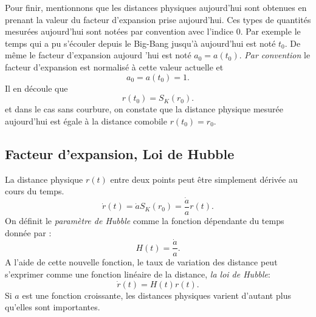 Pour finir, mentionnons que les distances physiques aujourd'hui sont obtenues en prenant la valeur du facteur d'expansion prise aujourd'hui. Ces types de quantités mesurées aujourd'hui sont notées par convention avec l'indice 0. Par exemple le temps qui a pu s'écouler depuis le Big-Bang jusqu'à aujourd'hui est noté $t_0$. De même le facteur d'expansion aujourd 'hui est noté $a_0=a(t_0)$.
\textit{Par convention} le facteur d'expansion est normalisé à cette valeur actuelle et 
\begin{equation}
a_0=a(t_0)=1.
\end{equation}
Il en découle que 
\begin{equation}
r(t_0)=S_K(r_0).
\end{equation}
et dans le cas sans courbure, on constate que la distance physique mesurée aujourd'hui est égale à la distance comobile $r(t_0)=r_0$.

\subsection{Facteur d'expansion, Loi de Hubble}
La distance physique $r(t)$ entre deux points peut être simplement dérivée au cours du temps.
\begin{equation}
\dot r(t)= \dot a S_K(r_0) =\frac{\dot a}{a}r(t).
\end{equation}
On définit le \textit{paramètre de Hubble} comme la fonction dépendante du temps donnée par :
\begin{equation}
H(t)=\frac{\dot a}{a}.
\label{e:hubble}
\end{equation}
A l'aide de cette nouvelle fonction, le taux de variation des distance peut s'exprimer comme une fonction linéaire de la distance, \textit{la loi de Hubble}:
\begin{equation}
\dot r(t) = H(t) r(t).
\label{e:hubble2}
\end{equation}
Si $a$ est une fonction croissante, les distances physiques varient d'autant plus qu'elles sont importantes.


